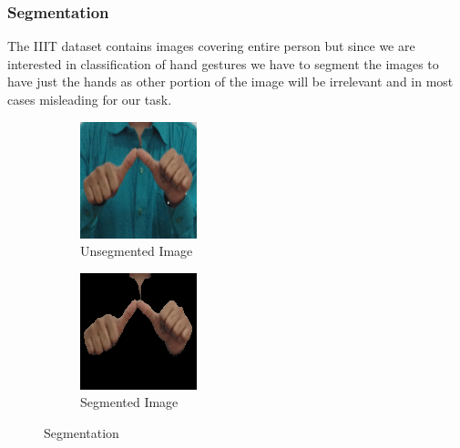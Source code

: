 \documentclass[conference]{IEEEtran}
\begin{document}
\subsubsection{Segmentation}  
The IIIT dataset contains images covering entire person but since we are interested in classification of hand gestures we have to segment the images to have just the hands as other portion of the image will be irrelevant and in most cases misleading for our task.
\begin{figure}[h]
\centering
\begin{subfigure}{.2\textwidth}
  \centering
  \includegraphics[width=.7\linewidth]{unsegmented}
  \caption{Unsegmented Image}
  \label{fig:sub1}
\end{subfigure}%
\begin{subfigure}{.2\textwidth}
  \centering
  \includegraphics[width=.7\linewidth]{segmented}
  \caption{Segmented Image}
  \label{fig:sub2}
\end{subfigure}
\captionsetup{justification=centering}
\caption{Segmentation}
\label{fig:test}
\end{figure}
\end{document}
